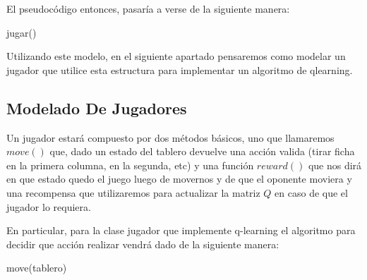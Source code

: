 El pseudocódigo entonces, pasaría a verse de la siguiente manera:
\pagebreak
\begin{algorithm}[h!]
\begin{algorithmic}[1]\parskip=1mm
 \caption{jugar()}
\end{algorithmic}
\end{algorithm}

Utilizando este modelo, en el siguiente apartado pensaremos como modelar un jugador que utilice esta estructura para implementar un algoritmo de qlearning.

\subsection{Modelado De Jugadores}

Un jugador estará compuesto por dos métodos básicos, uno que llamaremos $move()$ que, dado un estado del tablero devuelve una acción valida (tirar ficha en la primera columna, en la segunda, etc) y una función $reward()$ que nos dirá en que estado quedo el juego luego de movernos y de que el oponente moviera y una recompensa que utilizaremos para actualizar la matriz $Q$ en caso de que el jugador lo requiera.

En particular, para la clase jugador que implemente q-learning el algoritmo para decidir que acción realizar vendrá dado de la siguiente manera:

\begin{algorithm}[h!]
\begin{algorithmic}[1]\parskip=1mm
 \caption{move(tablero)}
\end{algorithmic}
\end{algorithm}

